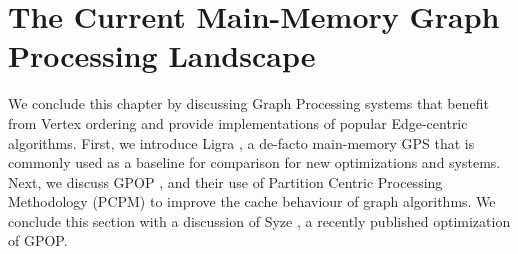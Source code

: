 \section{The Current Main-Memory Graph Processing Landscape}
We conclude this chapter by discussing Graph Processing systems that benefit from Vertex ordering and provide implementations of popular Edge-centric algorithms. First, we introduce Ligra \cite{ligra}, a de-facto main-memory GPS that is commonly used as a baseline for comparison for new optimizations and systems. Next, we discuss GPOP \cite{gpop}, and their use of Partition Centric Processing Methodology (PCPM) \cite{pcpm} to improve the cache behaviour of graph algorithms. We conclude this section with a discussion of Syze \cite{syze}, a recently published optimization of GPOP.